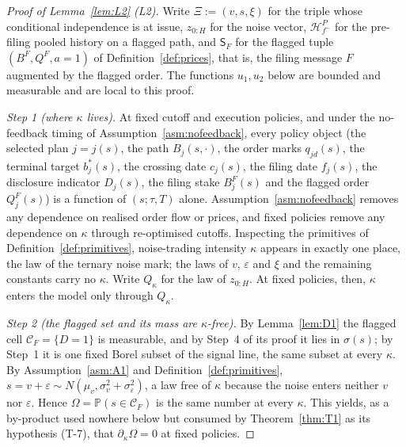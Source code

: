\documentclass[11pt]{article}
\newcommand{\Prb}{\mathbb{P}}
\newcommand{\Sfl}{\mathsf{S}_F}
\begin{document}
\begin{proof}[Proof of Lemma~\ref{lem:L2} (L2)]
Write $\Xi := (v,s,\xi)$ for the triple whose conditional independence is at issue, $z_{0:H}$ for the
noise vector, $\mathcal H_{f^-}^P$ for the pre-filing pooled history on a flagged path, and $\Sfl$
for the flagged tuple $(B^F,Q^F,a{=}1)$ of Definition~\ref{def:prices}, that is, the filing message
$F$ augmented by the flagged order. The functions $u_1,u_2$ below are bounded and measurable and are
local to this proof.

\emph{Step 1 (where $\kappa$ lives).} At fixed cutoff and execution policies, and under the
no-feedback timing of Assumption~\ref{asm:nofeedback}, every policy object (the selected plan
$j = j(s)$, the path $B_j(s,\cdot)$, the order marks $q_{jd}(s)$, the terminal target $b_j^*(s)$, the
crossing date $c_j(s)$, the filing date $f_j(s)$, the disclosure indicator $D_j(s)$, the filing stake
$B_j^F(s)$ and the flagged order $Q_j^F(s)$) is a function of $(s;\tau,T)$ alone.
Assumption~\ref{asm:nofeedback} removes any dependence on realised order flow or prices, and fixed
policies remove any dependence on $\kappa$ through re-optimised cutoffs. Inspecting the primitives of
Definition~\ref{def:primitives}, noise-trading intensity $\kappa$ appears in exactly one place, the
law of the ternary noise mark; the laws of $v$, $\varepsilon$ and $\xi$ and the remaining constants
carry no $\kappa$. Write $Q_\kappa$ for the law of $z_{0:H}$. At fixed policies, then, $\kappa$
enters the model only through $Q_\kappa$.

\emph{Step 2 (the flagged set and its mass are $\kappa$-free).} By Lemma~\ref{lem:D1} the flagged
cell $\mathcal C_F = \{D=1\}$ is measurable, and by Step~4 of its proof it lies in $\sigma(s)$; by
Step~1 it is one fixed Borel subset of the signal line, the same subset at every $\kappa$. By
Assumption~\ref{asm:A1} and Definition~\ref{def:primitives},
$s = v+\varepsilon \sim N(\mu_v,\sigma_v^2+\sigma_\varepsilon^2)$, a law free of $\kappa$ because the
noise enters neither $v$ nor $\varepsilon$. Hence $\Omega = \Prb(s \in \mathcal C_F)$ is the same
number at every $\kappa$. This yields, as a by-product used nowhere below but consumed by
Theorem~\ref{thm:T1} as its hypothesis (T-7), that $\partial_\kappa\Omega = 0$ at fixed policies.


\end{proof}
\end{document}
